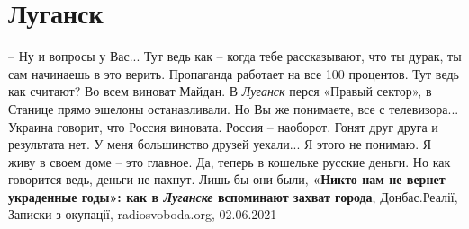  
 
 
 
 
\chapter{Луганск}

– Ну и вопросы у Вас... Тут ведь как – когда тебе рассказывают, что ты дурак,
ты сам начинаешь в это верить. Пропаганда работает на все 100 процентов. Тут
ведь как считают? Во всем виноват Майдан. В \emph{Луганск} перся «Правый сектор», в
Станице прямо эшелоны останавливали. Но Вы же понимаете, все с телевизора...
Украина говорит, что Россия виновата. Россия – наоборот. Гонят друг друга и
результата нет. У меня большинство друзей уехали... Я этого не понимаю. Я живу в
своем доме – это главное. Да, теперь в кошельке русские деньги. Но как
говорится ведь, деньги не пахнут. Лишь бы они были,
\textbf{«Никто нам не вернет украденные годы»: как в \emph{Луганске} вспоминают захват города},
Донбас.Реалії, Записки з окупації, radiosvoboda.org, 02.06.2021

